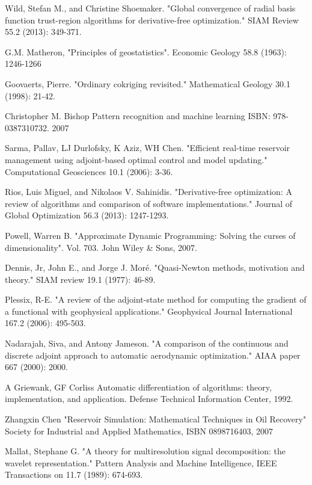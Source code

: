\documentclass[a4paper,onecolumn]{article}
\theoremstyle{remark}
\begin{document}
\begin{thebibliography}{9}
Wild, Stefan M., and Christine Shoemaker. 
"Global convergence of radial basis function trust-region algorithms for derivative-free optimization." 
SIAM Review 55.2 (2013): 349-371.

G.M. Matheron,
"Principles of geostatistics".
Economic Geology 58.8 (1963): 1246-1266

Goovaerts, Pierre. 
"Ordinary cokriging revisited." 
Mathematical Geology 30.1 (1998): 21-42.

Christopher M. Bishop
Pattern recognition and machine learning
ISBN: 978-0387310732. 2007

Sarma, Pallav, LJ Durlofsky, K Aziz, WH Chen. 
"Efficient real-time reservoir management using adjoint-based optimal control and model updating." 
Computational Geosciences 10.1 (2006): 3-36.

Rios, Luis Miguel, and Nikolaos V. Sahinidis. 
"Derivative-free optimization: A review of algorithms and comparison of software implementations." 
Journal of Global Optimization 56.3 (2013): 1247-1293.

Powell, Warren B.
"Approximate Dynamic Programming: Solving the curses of dimensionality".
Vol. 703. John Wiley \& Sons, 2007.

Dennis, Jr, John E., and Jorge J. Moré. 
"Quasi-Newton methods, motivation and theory." 
SIAM review 19.1 (1977): 46-89.

Plessix, R-E. 
"A review of the adjoint-state method for computing the gradient of a functional with geophysical applications." 
Geophysical Journal International 167.2 (2006): 495-503.

Nadarajah, Siva, and Antony Jameson. 
"A comparison of the continuous and discrete adjoint approach to automatic aerodynamic optimization." 
AIAA paper 667 (2000): 2000.

A Griewank, GF Corliss
Automatic differentiation of algorithms: theory, implementation, and application.
Defense Technical Information Center, 1992.

Zhangxin Chen
"Reservoir Simulation: Mathematical Techniques in Oil Recovery"
Society for Industrial and Applied Mathematics, ISBN 0898716403, 2007

Mallat, Stephane G. 
"A theory for multiresolution signal decomposition: the wavelet representation." 
Pattern Analysis and Machine Intelligence, IEEE Transactions on 11.7 (1989): 674-693.


\end{thebibliography}
\end{document}
